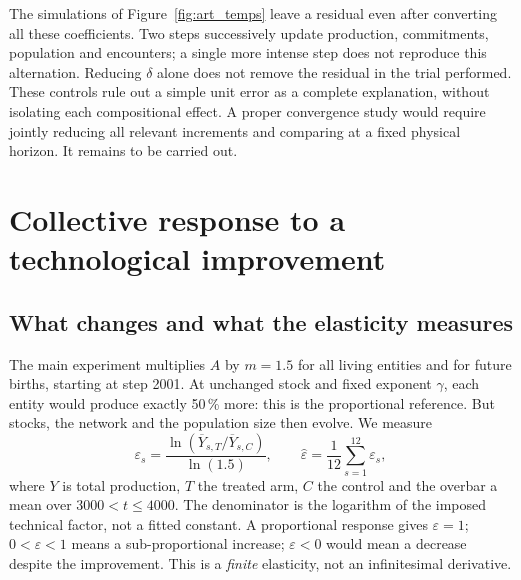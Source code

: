 
The simulations of Figure~\ref{fig:art_temps} leave a residual even
after converting all these coefficients. Two steps successively update
production, commitments, population and encounters; a single more
intense step does not reproduce this alternation. Reducing $\delta$
alone does not remove the residual in the trial performed. These
controls rule out a simple unit error as a complete explanation,
without isolating each compositional effect. A proper convergence study
would require jointly reducing all relevant increments and comparing at
a fixed physical horizon. It remains to be carried out.

\section{Collective response to a technological improvement}\label{sec:rebond}
\subsection{What changes and what the elasticity measures}
The main experiment multiplies $A$ by $m=1.5$ for all living entities
and for future births, starting at step 2001. At unchanged stock and
fixed exponent $\gamma$, each entity would produce exactly 50\,\% more:
this is the proportional reference. But stocks, the network and the
population size then evolve. We measure
\begin{equation}
 \varepsilon_s=\frac{\ln(\overline Y_{s,T}/\overline Y_{s,C})}{\ln(1.5)},
 \qquad \widehat\varepsilon=\frac1{12}\sum_{s=1}^{12}\varepsilon_s,
 \label{eq:eps}
\end{equation}
where $Y$ is total production, $T$ the treated arm, $C$ the control and
the overbar a mean over $3000<t\le4000$. The denominator is the
logarithm of the imposed technical factor, not a fitted constant. A
proportional response gives $\varepsilon=1$; $0<\varepsilon<1$ means a
sub-proportional increase; $\varepsilon<0$ would mean a decrease despite
the improvement. This is a \emph{finite} elasticity, not an
infinitesimal derivative.


